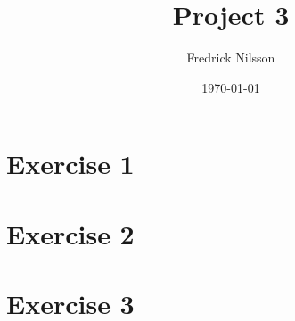 \documentclass[12pt]{article}
\title{Project 3}
\author{Fredrick Nilsson}
\date{\today}
\begin{document}
\maketitle

\tableofcontents

\newpage

\section*{Exercise 1}

\newpage

\section*{Exercise 2}

\newpage

\section*{Exercise 3}
\end{document}
